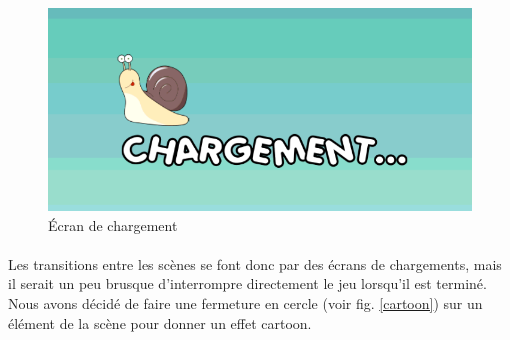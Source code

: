 \begin{figure}[H]\centering
  \includegraphics[scale=0.3]{./img/loading.png}
  \caption{Écran de chargement}
  \label{loading}
\end{figure}

\paragraph{}
Les transitions entre les scènes se font donc par des écrans de chargements, mais il serait un peu brusque d'interrompre directement le jeu lorsqu'il est terminé. Nous avons décidé de faire une fermeture en cercle (voir fig. \ref{cartoon}) sur un élément de la scène pour donner un effet cartoon.

